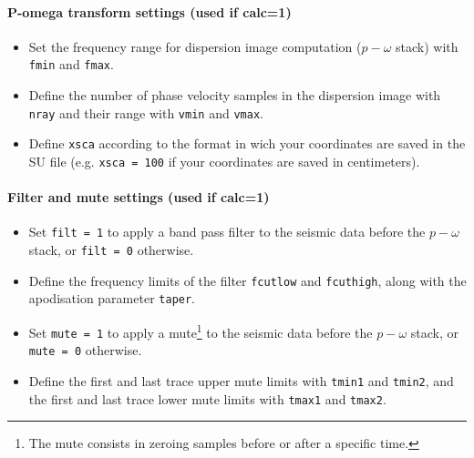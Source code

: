 \documentclass[twoside,a4paper]{article}
\begin{document}
\paragraph{P-omega transform settings (used if calc=1)}
\begin{itemize}
\setlength\itemsep{2ex}
\setlength{\parindent}{5ex}

\item Set the frequency range for dispersion image computation ($p-\omega$ stack) with \verb|fmin| and \verb|fmax|.

\item Define the number of phase velocity samples in the dispersion image with \verb|nray| and their range with \verb|vmin| and \verb|vmax|.

\item Define \verb|xsca| according to the format in wich your coordinates are saved in the SU file (e.g. \verb|xsca = 100| if your coordinates are saved in centimeters).
\end{itemize}

\paragraph{Filter and mute settings (used if calc=1)}
\begin{itemize}
\setlength\itemsep{2ex}
\setlength{\parindent}{5ex}

\item Set \verb|filt = 1| to apply a band pass filter to the seismic data before the $p-\omega$ stack, or \verb|filt = 0| otherwise.

\item Define the frequency limits of the filter \verb|fcutlow| and \verb|fcuthigh|, along with the apodisation parameter \verb|taper|.

\item Set \verb|mute = 1| to apply a mute\footnote{The mute consists in zeroing samples before or after a specific time.} to the seismic data before the $p-\omega$ stack, or \verb|mute = 0| otherwise.

\item Define the first and last trace upper mute limits with \verb|tmin1| and \verb|tmin2|, and the first and last trace lower mute limits with \verb|tmax1| and \verb|tmax2|.
\end{itemize}
\end{document}
